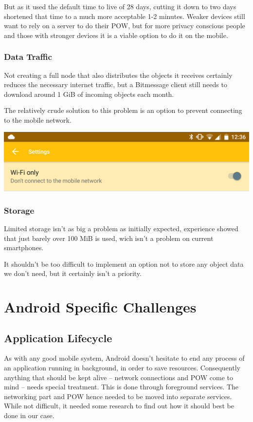 \documentclass{bfh}
\begin{document}
  But as it used the default time to live of 28 days, cutting it down to two days shortened that time to a much more acceptable 1-2 minutes. Weaker devices still want to rely on a server to do their \ac{POW}, but for more privacy conscious people and those with stronger devices it is a viable option to do it on the mobile.

  \subsubsection{Data Traffic}
  Not creating a full node that also distributes the objects it receives certainly reduces the necessary internet traffic, but a Bitmessage client still needs to download around 1 GiB of incoming objects each month.

  The relatively crude solution to this problem is an option to prevent connecting to the mobile network.

  \begin{center}
    \includegraphics[width=0.8 \textwidth]{images/screenshots/wifi_only_setting.png}
  \end{center}

  \subsubsection{Storage}
  Limited storage isn't as big a problem as initially expected, experience showed that just barely over 100 MiB is used, wich isn't a problem on current smartphones.

  It shouldn't be too difficult to implement an option not to store any object data we don't need, but it certainly isn't a priority.


  \newpage
  \section{Android Specific Challenges}
  \subsection{Application Lifecycle}
  As with any good mobile system, Android doesn't hesitate to end any process of an application running in background, in order to save resources. Consequently anything that should be kept alive -- network connections and \ac{POW} come to mind -- needs special treatment. This is done through foreground services. The networking part and \ac{POW} hence needed to be moved into separate services. While not difficult, it needed some research to find out how it should best be done in our case.
\end{document}
